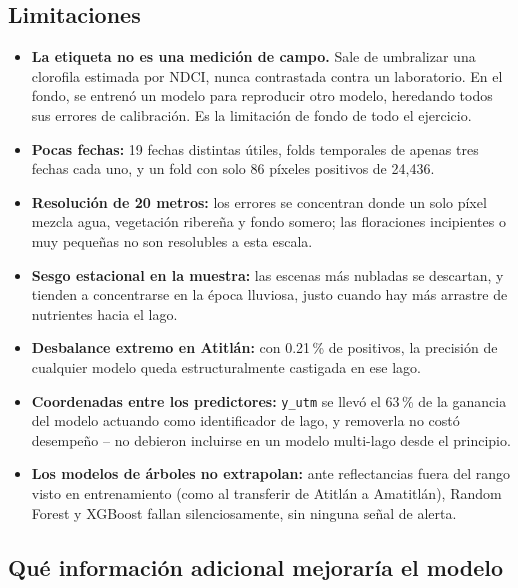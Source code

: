 \documentclass[11pt]{article}
\begin{document}
\subsection{Limitaciones}

\begin{itemize}
    \item \textbf{La etiqueta no es una medición de campo.} Sale de umbralizar una clorofila estimada por NDCI, nunca contrastada contra un laboratorio. En el fondo, se entrenó un modelo para reproducir otro modelo, heredando todos sus errores de calibración. Es la limitación de fondo de todo el ejercicio.
    \item \textbf{Pocas fechas:} 19 fechas distintas útiles, folds temporales de apenas tres fechas cada uno, y un fold con solo 86 píxeles positivos de 24{,}436.
    \item \textbf{Resolución de 20 metros:} los errores se concentran donde un solo píxel mezcla agua, vegetación ribereña y fondo somero; las floraciones incipientes o muy pequeñas no son resolubles a esta escala.
    \item \textbf{Sesgo estacional en la muestra:} las escenas más nubladas se descartan, y tienden a concentrarse en la época lluviosa, justo cuando hay más arrastre de nutrientes hacia el lago.
    \item \textbf{Desbalance extremo en Atitlán:} con 0.21\,\% de positivos, la precisión de cualquier modelo queda estructuralmente castigada en ese lago.
    \item \textbf{Coordenadas entre los predictores:} \texttt{y\_utm} se llevó el 63\,\% de la ganancia del modelo actuando como identificador de lago, y removerla no costó desempeño -- no debieron incluirse en un modelo multi-lago desde el principio.
    \item \textbf{Los modelos de árboles no extrapolan:} ante reflectancias fuera del rango visto en entrenamiento (como al transferir de Atitlán a Amatitlán), Random Forest y XGBoost fallan silenciosamente, sin ninguna señal de alerta.
\end{itemize}

\subsection{Qué información adicional mejoraría el modelo}
\end{document}
